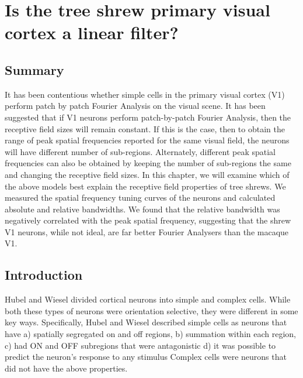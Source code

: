\chapter{Is the tree shrew primary visual cortex a linear filter?}
\pagebreak
	\section{Summary}
	It has been contentious whether simple cells in the primary visual cortex (V1) perform patch by patch Fourier Analysis on the visual scene. It has been suggested that if V1 neurons perform patch-by-patch Fourier Analysis, then the receptive field sizes will remain constant. If this is the case, then to obtain the range of peak spatial frequencies reported for the same visual field, the neurons will have different number of sub-regions. Alternately, different peak spatial frequencies can also be obtained by keeping the number of sub-regions the same and changing the receptive field sizes. In this chapter, we will examine which of the above models best explain the receptive field properties of tree shrews. We measured the spatial frequency tuning curves of the neurons and calculated absolute and relative bandwidths. We found that the relative bandwidth was negatively correlated with the peak spatial frequency, suggesting that the shrew V1 neurons, while not ideal, are far better Fourier Analysers than the macaque V1.
	\pagebreak
	\section{Introduction}
	
		Hubel and Wiesel divided cortical neurons into simple and complex cells. While both these types of neurons were orientation selective, they were 	different in some key ways. Specifically, Hubel and Wiesel described simple cells as neurons that have
		a) spatially segregated on and off regions, 
		b) summation within each region, 
		c) had ON and OFF subregions that were antagonistic 
		d) it was possible to predict the neuron’s response to any stimulus
		Complex cells were neurons that did not have the above properties. 
	
